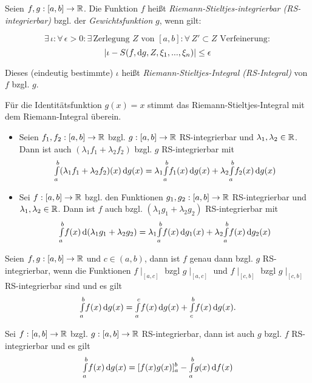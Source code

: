 \documentclass{cheat-sheet}
\begin{document}
\begin{defn}
Seien $f, g : [a, b] \to \mathbb{R}$. Die Funktion $f$ heißt \emph{Riemann-Stieltjes-integrierbar (RS-integrierbar)} bzgl. der \emph{Gewichtsfunktion} $g$, wenn gilt:

\[ \exists\,\iota : \forall\,\epsilon > 0 : \exists\,\text{Zerlegung $Z$ von $[a, b]$} : \forall\,Z' \subset Z \text{ Verfeinerung} : \]
\[ |\iota - S(f, \mathrm{d} g, Z, \xi_1, ..., \xi_n)| \le \epsilon \]

Dieses (eindeutig bestimmte) $\iota$ heißt \emph{Riemann-Stieltjes-Integral (RS-Integral)} von $f$ bzgl. $g$.
\end{defn}

\begin{bem}
Für die Identitätsfunktion $g(x) = x$ stimmt das Riemann-Stieltjes-Integral mit dem Riemann-Integral überein.
\end{bem}


\begin{satz}
\begin{itemize}
  \item Seien $f_1, f_2 : [a, b] \to \mathbb{R}$ bzgl. $g : [a, b] \to \mathbb{R}$ RS-integrierbar und $\lambda_1, \lambda_2 \in \mathbb{R}$. Dann ist auch $(\lambda_1 f_1 + \lambda_2 f_2)$ bzgl. $g$ RS-integrierbar mit
  \[ {\textstyle \int\limits_{a}^{b}} (\lambda_1 f_1 + \lambda_2 f_2)(x) \,\mathrm{d} g(x) = \lambda_1 {\textstyle \int\limits_{a}^{b}} f_1(x) \,\mathrm{d} g(x) + \lambda_2 {\textstyle \int\limits_{a}^{b}} f_2(x) \,\mathrm{d} g(x) \]
  \item Sei $f : [a, b] \to \mathbb{R}$ bzgl. den Funktionen $g_1, g_2 : [a, b] \to \mathbb{R}$ RS-integrierbar und $\lambda_1, \lambda_2 \in \mathbb{R}$. Dann ist $f$ auch bzgl. $(\lambda_1 g_1 + \lambda_2 g_2)$ RS-integrierbar mit
  \[ {\textstyle \int\limits_{a}^{b}} f(x) \,\mathrm{d} (\lambda_1 g_1 + \lambda_2 g_2) = \lambda_1 {\textstyle \int\limits_{a}^{b}} f(x) \,\mathrm{d} g_1(x) + \lambda_2 {\textstyle \int\limits_{a}^{b}} f(x) \,\mathrm{d} g_2(x) \]
\end{itemize}
\end{satz}

\begin{satz}
Seien $f, g : [a, b] \to \mathbb{R}$ und $c \in (a, b)$, dann ist $f$ genau dann bzgl. $g$ RS-integrierbar, wenn die Funktionen $f\mid_{[a, c]}$ bzgl $g\mid_{[a, c]}$ und $f\mid_{[c, b]}$ bzgl $g\mid_{[c, b]}$ RS-integrierbar sind und es gilt
\[ {\textstyle \int\limits_{a}^{b}} f(x) \,\mathrm{d} g(x) = {\textstyle \int\limits_{a}^{c}} f(x) \,\mathrm{d} g(x) + {\textstyle \int\limits_{c}^{b}} f(x) \,\mathrm{d} g(x). \]
\end{satz}

\begin{satz}
Sei $f : [a, b] \to \mathbb{R}$ bzgl. $g : [a, b] \to \mathbb{R}$ RS-integrierbar, dann ist auch $g$ bzgl. $f$ RS-integrierbar und es gilt
\[ {\textstyle \int\limits_{a}^{b}} f(x) \,\mathrm{d} g(x) = [f(x)g(x)]_a^b - {\textstyle \int\limits_{a}^{b}} g(x) \,\mathrm{d} f(x) \]
\end{satz}
\end{document}
